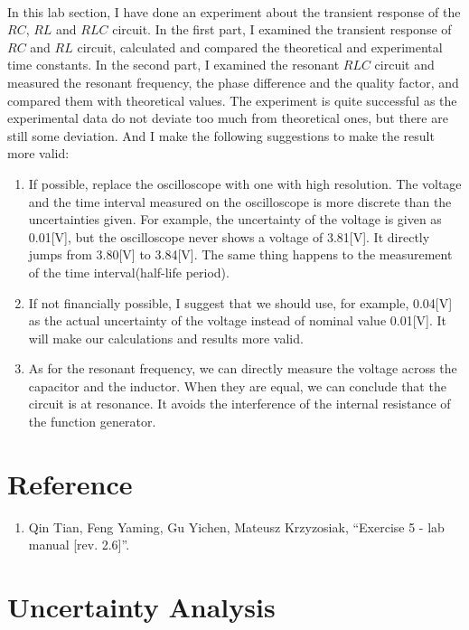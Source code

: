 \documentclass{my_template}
\begin{document}
    \paragraph{} In this lab section, I have done an experiment about the transient response of the $RC$, $RL$ and $RLC$ circuit. In the first part, I examined the transient response of $RC$ and $RL$ circuit, calculated and compared the theoretical and experimental time constants. In the second part, I examined the resonant $RLC$ circuit and measured the resonant frequency, the phase difference and the quality factor, and compared them with theoretical values. The experiment is quite successful as the experimental data do not deviate too much from theoretical ones, but there are still some deviation. And I make the following suggestions to make the result more valid:
    \begin{enumerate}
        \item If possible, replace the oscilloscope with one with high resolution. The voltage and the time interval measured on the oscilloscope is more discrete than the uncertainties given. For example, the uncertainty of the voltage is given as 0.01[V], but the oscilloscope never shows a voltage of 3.81[V]. It directly jumps from 3.80[V] to 3.84[V]. The same thing happens to the measurement of the time interval(half-life period).
        \item If not financially possible, I suggest that we should use, for example, 0.04[V] as the actual uncertainty of the voltage instead of nominal value 0.01[V]. It will make our calculations and results more valid.   
        \item As for the resonant frequency, we can directly measure the voltage across the capacitor and the inductor. When they are equal, we can conclude that the circuit is at resonance. It avoids the interference of the internal resistance of the function generator. 
    \end{enumerate} 
    \section{Reference}
    \begin{enumerate}
        \item Qin Tian, Feng Yaming, Gu Yichen, Mateusz Krzyzosiak, ``Exercise 5 - lab manual [rev. 2.6]''.
    \end{enumerate}
    \renewcommand\thesection{\Alph{section}} 
    \setcounter{section}{0}
    \newpage
    \section{Uncertainty Analysis}
\end{document}
